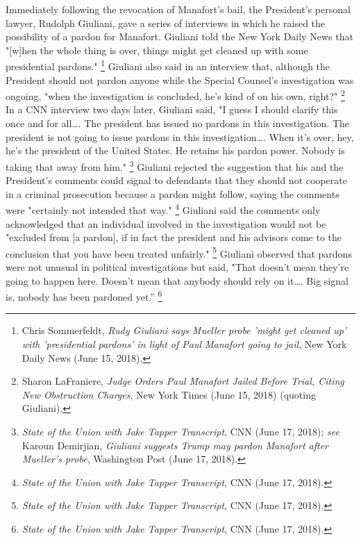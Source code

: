 {Immediately following the revocation of Manafort's bail, the President's personal lawyer, Rudolph Giuliani, gave a series of interviews in which he raised the possibility of a pardon for Manafort.
Giuliani told the New York Daily News that "[w]hen the whole thing is over, things might get cleaned up with some presidential pardons."%
\footnote{Chris Sommerfeldt, \textit{Rudy Giuliani says Mueller probe 'might get cleaned up' with 'presidential pardons' in light of Paul Manafort going to jail}, New York Daily News (June 15, 2018).}
Giuliani also said in an interview that, although the President should not pardon anyone while the Special Counsel's investigation was ongoing, "when the investigation is concluded, he's kind of on his own, right?"%
\footnote{Sharon LaFraniere, \textit{Judge Orders Paul Manafort Jailed Before Trial, Citing New Obstruction Charges}, New York Times (June 15, 2018) (quoting Giuliani).}
In a CNN interview two days later, Giuliani said, "I guess I should clarify this once and for all\dots.
The president has issued no pardons in this investigation.
The president is not going to issue pardons in this investigation\dots. When it's over, hey, he's the president of the United States.
He retains his pardon power.
Nobody is taking that away from him."%
\footnote{\textit{State of the Union with Jake Tapper Transcript}, CNN (June 17, 2018);
\textit{see} Karoun Demirjian, \textit{Giuliani suggests Trump may pardon Manafort after Mueller's probe}, Washington Post (June 17, 2018).}
Giuliani rejected the suggestion that his and the President's comments could signal to defendants that they should not cooperate in a criminal prosecution because a pardon might follow, saying the comments were "certainly not intended that way."%
\footnote{\textit{State of the Union with Jake Tapper Transcript}, CNN (June 17, 2018).}
Giuliani said the comments only acknowledged that an individual involved in the investigation would not be "excluded from [a pardon], if in fact the president and his advisors come to the conclusion that you have been treated unfairly."%
\footnote{\textit{State of the Union with Jake Tapper Transcript}, CNN (June 17, 2018).}
Giuliani observed that pardons were not unusual in political investigations but said, "That doesn't mean they're going to happen here.
Doesn't mean that anybody should rely on it\dots.
Big signal is, nobody has been pardoned yet.''%
\footnote{\textit{State of the Union with Jake Tapper Transcript}, CNN (June 17, 2018).}

}
